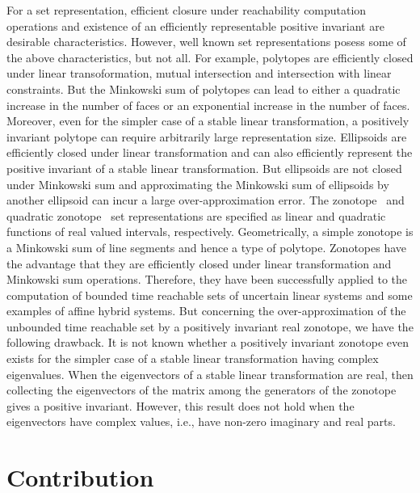 \documentclass[11pt,a4paper,twoside,openright]{article}
\begin{document}
For a set representation, efficient closure under reachability
computation operations and existence of an efficiently representable
positive invariant are desirable characteristics.  However, well known
set representations posess some of the above characteristics, but not
all.  For example, polytopes are efficiently closed under linear
transoformation, mutual intersection and intersection with linear
constraints.  But the Minkowski sum of polytopes can lead to either a
quadratic increase in the number of faces or an exponential increase
in the number of faces.  Moreover, even for the simpler case of a
stable linear transformation, a positively invariant polytope can
require arbitrarily large representation size.  Ellipsoids are
efficiently closed under linear transformation and can also
efficiently represent the positive invariant of a stable linear
transformation.  But ellipsoids are not closed under Minkowski sum and
approximating the Minkowski sum of ellipsoids by another ellipsoid can
incur a large over-approximation error.  The
zonotope~\cite{DBLP:conf/hybrid/Girard05} and quadratic
zonotope~\cite{DBLP:conf/aplas/AdjeGW15} set representations are
specified as linear and quadratic functions of real valued intervals,
respectively.  Geometrically, a simple zonotope is a Minkowski sum of
line segments and hence a type of polytope.  Zonotopes have the
advantage that they are efficiently closed under linear transformation
and Minkowski sum operations.  Therefore, they have been successfully
applied to the computation of bounded time reachable sets of uncertain
linear systems and some examples of affine hybrid systems.  But
concerning the over-approximation of the unbounded time reachable set
by a positively invariant real zonotope, we have the following
drawback.  It is not known whether a positively invariant zonotope
even exists for the simpler case of a stable linear transformation
having complex eigenvalues.  When the eigenvectors of a stable linear
transformation are real, then collecting the eigenvectors of the
matrix among the generators of the zonotope gives a positive
invariant.  However, this result does not hold when the eigenvectors
have complex values, i.e., have non-zero imaginary and real parts.



\section {Contribution}
\end{document}
